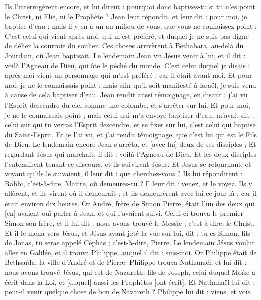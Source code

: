 \begin{multicols}{2}
Ils l'interrogèrent encore, et lui dirent : pourquoi donc baptises-tu si tu n'es point le Christ, ni Elie, ni le Prophète ?
Jean leur répondit, et leur dit : pour moi, je baptise d'eau ; mais il y en a un au milieu de vous, que vous ne connaissez point ;
C'est celui qui vient après moi, qui m'est préféré, et duquel je ne suis pas digne de délier la courroie du soulier.
Ces choses arrivèrent à Bethabara, au-delà du Jourdain, où Jean baptisait.
Le lendemain Jean vit Jésus venir à lui, et il dit : voilà l'Agneau de Dieu, qui ôte le péché du monde.
C'est celui duquel je disais : après moi vient un personnage qui m'est préféré ; car il était avant moi.
Et pour moi, je ne le connaissais point ; mais afin qu'il soit manifesté à Israël, je suis venu à cause de cela baptiser d'eau.
Jean rendit aussi témoignage, en disant : j'ai vu l'Esprit descendre du ciel comme une colombe, et s'arrêter sur lui.
Et pour moi, je ne le connaissais point ; mais celui qui m'a envoyé baptiser d'eau, m'avait dit : celui sur qui tu verras l'Esprit descendre, et se fixer sur lui, c'est celui qui baptise du Saint-Esprit.
Et je l'ai vu, et j'ai rendu témoignage, que c'est lui qui est le Fils de Dieu.
Le lendemain encore Jean s'arrêta, et [avec lui] deux de ses disciples ;
Et regardant Jésus qui marchait, il dit : voilà l'Agneau de Dieu.
Et les deux disciples l'entendirent tenant ce discours, et ils suivirent Jésus.
Et Jésus se retournant, et voyant qu'ils le suivaient, il leur dit : que cherchez-vous ? Ils lui répondirent : Rabbi, c'est-à-dire, Maître, où demeures-tu ?
Il leur dit : venez, et le voyez. Ils y allèrent, et ils virent où il demeurait ; et ils demeurèrent avec lui ce jour-là ; car il était environ dix heures.
Or André, frère de Simon Pierre, était l'un des deux qui [en] avaient ouï parler à Jean, et qui l'avaient suivi.
Celui-ci trouva le premier Simon son frère, et il lui dit : nous avons trouvé le Messie ; c'est-à-dire, le Christ.
Et il le mena vers Jésus, et Jésus ayant jeté la vue sur lui, dit : tu es Simon, fils de Jonas, tu seras appelé Céphas ; c'est-à-dire, Pierre.
Le lendemain Jésus voulut aller en Galilée, et il trouva Philippe, auquel il dit : suis-moi.
Or Philippe était de Bethsaïda, la ville d'André et de Pierre.
Philippe trouva Nathanaël, et lui dit : nous avons trouvé Jésus, qui est de Nazareth, fils de Joseph, celui duquel Moïse a écrit dans la Loi, et [duquel] aussi les Prophètes [ont écrit].
Et Nathanaël lui dit : peut-il venir quelque chose de bon de Nazareth ? Philippe lui dit : viens, et vois.

\end{multicols}
